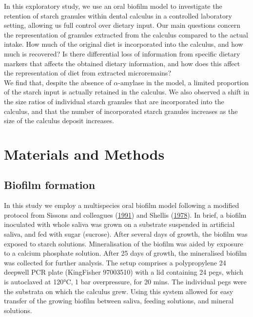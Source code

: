 \documentclass[
  b5paper,
]{book}
\begin{document}
In this exploratory study, we use an oral biofilm model to investigate
the retention of starch granules within dental calculus in a controlled
laboratory setting, allowing us full control over dietary input. Our
main questions concern the representation of granules extracted from the
calculus compared to the actual intake. How much of the original diet is
incorporated into the calculus, and how much is recovered? Is there
differential loss of information from specific dietary markers that
affects the obtained dietary information, and how does this affect the
representation of diet from extracted microremains?\\
We find that, despite the absence of \(\alpha\)-amylase in the model, a
limited proportion of the starch input is actually retained in the
calculus. We also observed a shift in the size ratios of individual
starch granules that are incorporated into the calculus, and that the
number of incorporated starch granules increases as the size of the
calculus deposit increases.

\hypertarget{materials-and-methods-1}{%
\section{Materials and Methods}\label{materials-and-methods-1}}

\hypertarget{biofilm-formation}{%
\subsection{Biofilm formation}\label{biofilm-formation}}

In this study we employ a multispecies oral biofilm model following a
modified protocol from Sissons and colleagues
(\protect\hyperlink{ref-sissonsMultistationPlaque1991}{1991}) and
Shellis (\protect\hyperlink{ref-shellisSyntheticSaliva1978}{1978}). In
brief, a biofilm inoculated with whole saliva was grown on a substrate
suspended in artificial saliva, and fed with sugar (sucrose). After
several days of growth, the biofilm was exposed to starch solutions.
Mineralisation of the biofilm was aided by exposure to a calcium
phosphate solution. After 25 days of growth, the mineralised biofilm was
collected for further analysis. The setup comprises a polypropylene 24
deepwell PCR plate (KingFisher 97003510) with a lid containing 24 pegs,
which is autoclaved at 120°C, 1 bar overpressure, for 20 mins. The
individual pegs were the substrata on which the calculus grew. Using
this system allowed for easy transfer of the growing biofilm between
saliva, feeding solutions, and mineral solutions.
\end{document}
